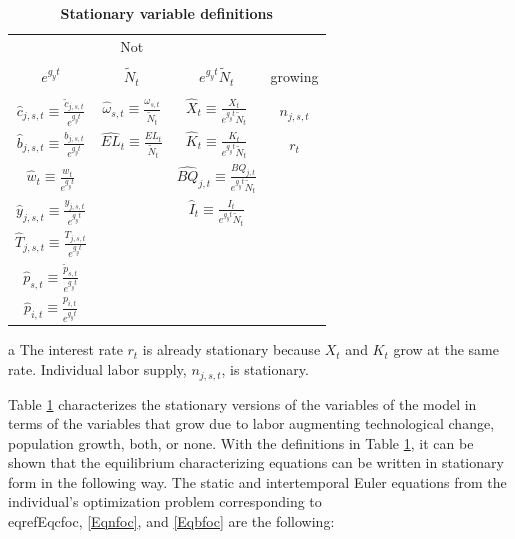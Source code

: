     \begin{table}[htbp] \centering \captionsetup{width=3.3in}
    \caption{\label{TabStatVars}\textbf{Stationary variable definitions}}
      \begin{threeparttable}
      \begin{tabular}{>{\small}c >{\small}c >{\small}c |>{\small}c}
        \hline\hline
        \multicolumn{3}{c}{Sources of growth} & Not \\
        & & & \\[-4mm]
        $e^{g_y t}$ & $\tilde{N}_t$ & $e^{g_y t}\tilde{N}_t$ & growing\tnote{a} \\
        \hline
        & & \\[-4mm]
        $\hat{c}_{j,s,t}\equiv\frac{\tilde{c}_{j,s,t}}{e^{g_y t}}$ & $\hat{\omega}_{s,t}\equiv\frac{\omega_{s,t}}{\tilde{N}_t}$ & $\hat{X}_t\equiv\frac{X_t}{e^{g_y t}\tilde{N}_t}$ & $n_{j,s,t}$ \\[2mm]
        $\hat{b}_{j,s,t}\equiv\frac{b_{j,s,t}}{e^{g_y t}}$ & $\hat{EL}_t\equiv\frac{EL_t}{\tilde{N}_t}$ & $\hat{K}_t\equiv\frac{K_t}{e^{g_y t}\tilde{N}_t}$ & $r_t$ \\[2mm]
        $\hat{w}_t\equiv\frac{w_t}{e^{g_y t}}$ &  & $\hat{BQ}_{j,t}\equiv\frac{BQ_{j,t}}{e^{g_y t}\tilde{N}_t}$ &  \\[2mm]
        $\hat{y}_{j,s,t}\equiv \frac{y_{j,s,t}}{e^{g_y t}}$ &  & $\hat{I}_{t}\equiv \frac{I_{t}}{e^{g_{y} t}\tilde{N}_t}$ &  \\[2mm]
        $\hat{T}_{j,s,t}\equiv\frac{T_{j,s,t}}{e^{g_y t}}$ &  &  &  \\[2mm]
        $\hat{p}_{s,t}\equiv\frac{\tilde{p}_{s,t}}{e^{g_y t}}$ &  &  &  \\[2mm]
        $\hat{p}_{i,t}\equiv\frac{p_{i,t}}{e^{g_y t}}$ &  &  &  \\[2mm]
        \hline\hline
      \end{tabular}
      \begin{tablenotes}
        \scriptsize{\item[a]The interest rate $r_t$ is already stationary because $X_t$ and $K_t$ grow at the same rate. Individual labor supply, $n_{j,s,t}$, is stationary.}
      \end{tablenotes}
      \end{threeparttable}
    \end{table}


    Table \ref{TabStatVars} characterizes the stationary versions of the variables of the model in terms of the variables that grow due to labor augmenting technological change, population growth, both, or none. With the definitions in Table \ref{TabStatVars}, it can be shown that the equilibrium characterizing equations can be written in stationary form in the following way. The static and intertemporal Euler equations from the individual's optimization problem corresponding to \\eqref{Eqcfoc}, \eqref{Eqnfoc}, and \eqref{Eqbfoc} are the following:
    
